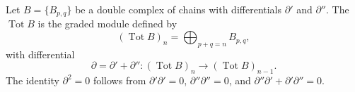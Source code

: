 Let $B = \{B_{p,q}\}$ be a double complex of chains with differentials $\partial'$ and $\partial''$. The  $\operatorname{Tot} B$ is the graded module defined by
$$(\operatorname{Tot} B)_n = \bigoplus_{p+q=n} B_{p,q},$$
with differential
$$\partial = \partial' + \partial'' : (\operatorname{Tot} B)_n \rightarrow (\operatorname{Tot} B)_{n-1}.$$
The identity $\partial^2 = 0$ follows from $\partial'\partial' = 0$, $\partial''\partial'' = 0$, and $\partial''\partial' + \partial'\partial'' = 0$.
